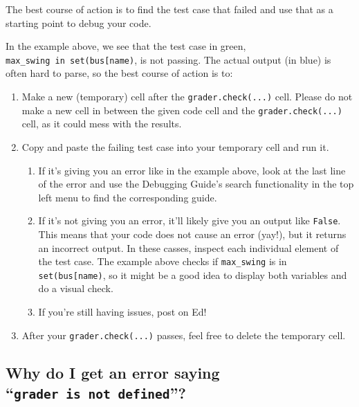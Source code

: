 \documentclass[
  letterpaper,
  DIV=11,
  numbers=noendperiod]{scrreprt}
\providecommand{\tightlist}{%
  \setlength{\itemsep}{0pt}\setlength{\parskip}{0pt}}\usepackage{longtable,booktabs,array}
\begin{document}
The best course of action is to find the test case that failed and use
that as a starting point to debug your code.

In the example above, we see that the test case in green,
\texttt{max\_swing\ in\ set(bus{[}\textquotesingle{}name\textquotesingle{}{]})},
is not passing. The actual output (in blue) is often hard to parse, so
the best course of action is to:

\begin{enumerate}
\def\labelenumi{\arabic{enumi}.}
\item
  Make a new (temporary) cell after the \texttt{grader.check(...)} cell.
  Please do not make a new cell in between the given code cell and the
  \texttt{grader.check(...)} cell, as it could mess with the results.
\item
  Copy and paste the failing test case into your temporary cell and run
  it.

  \begin{enumerate}
  \def\labelenumii{\alph{enumii}.}
  \tightlist
  \item
    If it's giving you an error like in the example above, look at the
    last line of the error and use the Debugging Guide's search
    functionality in the top left menu to find the corresponding guide.
  \item
    If it's not giving you an error, it'll likely give you an output
    like \texttt{False}. This means that your code does not cause an
    error (yay!), but it returns an incorrect output. In these casses,
    inspect each individual element of the test case. The example above
    checks if \texttt{max\_swing} is in
    \texttt{set(bus{[}\textquotesingle{}name\textquotesingle{}{]})}, so
    it might be a good idea to display both variables and do a visual
    check.
  \item
    If you're still having issues, post on Ed!
  \end{enumerate}
\item
  After your \texttt{grader.check(...)} passes, feel free to delete the
  temporary cell.
\end{enumerate}

\subsection{\texorpdfstring{Why do I get an error saying
``\texttt{grader\ is\ not\ defined}''?}{Why do I get an error saying ``grader is not defined''?}}\label{why-do-i-get-an-error-saying-grader-is-not-defined}
\end{document}
